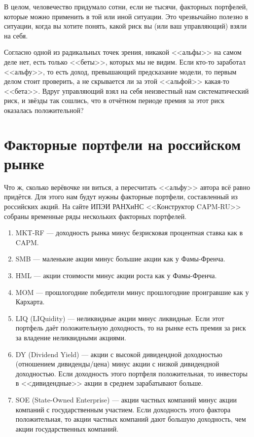 В целом, человечество придумало сотни, если не тысячи, факторных портфелей, которые можно применить в той или иной ситуации. Это чрезвычайно полезно в ситуации, когда вы хотите понять, какой риск вы (или ваш управляющий) взяли на себя.

Согласно одной из радикальных точек зрения, никакой <<альфы>> на самом деле нет, есть только <<беты>>, которых мы не видим. Если кто-то заработал <<альфу>>, то есть доход, превышающий предсказание модели, то первым делом стоит проверить, а не скрывается ли за этой <<альфой>> какая-то <<бета>>. Вдруг управляющий взял на себя неизвестный нам систематический риск, и звёзды так сошлись, что в отчётном периоде премия за этот риск оказалась положительной?

\section{Факторные портфели на российском рынке}

Что ж, сколько верёвочке ни виться, а пересчитать <<альфу>> автора всё равно придётся. Для этого нам будут нужны факторные портфели, составленный из российских акций. На сайте ИПЭИ РАНХиНС <<Конструктор CAPM-RU>> \cite{capmruWeb} собраны временные ряды нескольких факторных портфелей.

\begin{enumerate}
\item MKT-RF --- доходность рынка минус безрисковая процентная ставка как в CAPM.
\item SMB --- маленькие акции минус большие акции как у Фамы-Френча.
\item HML --- акции стоимости минус акции роста как у Фамы-Френча.
\item MOM --- прошлогодние победители минус прошлогодние проигравшие как у Кархарта.
\item LIQ (LIQuidity) --- неликвидные акции минус ликвидные. Если этот портфель даёт положительную доходность, то на рынке есть премия за риск за владение неликвидными акциями.
\item DY (Dividend Yield) --- акции с высокой дивидендной доходностью (отношением дивиденды/цена) минус акции с низкой дивидендной доходностью. Если доходность этого портфеля положительная, то инвесторы в <<дивидендные>> акции в среднем зарабатывают больше.
\item SOE (State-Owned Enterprise) --- акции частных компаний минус акции компаний с государственным участием. Если доходность этого фактора положительная, то акции частных компаний дают большую доходность, чем акции государственных компаний.
\end{enumerate}

